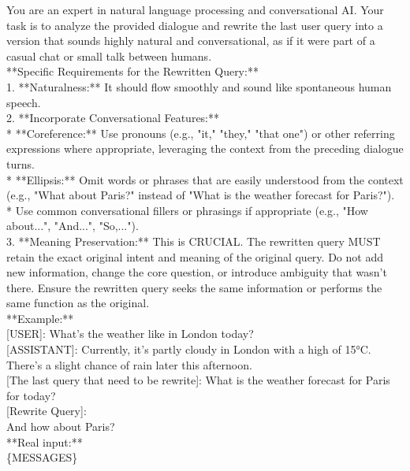 
\begin{tcolorbox}[
    enhanced,
    colback=white, %
    colframe=black, %
    arc=5mm, %
    boxrule=1pt,
    left=2mm, %
    right=2mm, %
    top=1mm, %
    bottom=1mm %
]

You are an expert in natural language processing and conversational AI. Your task is to analyze the provided dialogue and rewrite the last user query into a version that sounds highly natural and conversational, as if it were part of a casual chat or small talk between humans.\\
 
**Specific Requirements for the Rewritten Query:**\\
 
1.  **Naturalness:** It should flow smoothly and sound like spontaneous human speech.\\
2.  **Incorporate Conversational Features:**\\
    *   **Coreference:** Use pronouns (e.g., "it," "they," "that one") or other referring expressions where appropriate, leveraging the context from the preceding dialogue turns.\\
    *   **Ellipsis:** Omit words or phrases that are easily understood from the context (e.g., "What about Paris?" instead of "What is the weather forecast for Paris?").\\
    *   Use common conversational fillers or phrasings if appropriate (e.g., "How about...", "And...", "So,...").\\
3.  **Meaning Preservation:** This is CRUCIAL. The rewritten query MUST retain the exact original intent and meaning of the original query. Do not add new information, change the core question, or introduce ambiguity that wasn't there. Ensure the rewritten query seeks the same information or performs the same function as the original.\\
 
 
**Example:**\\
{[USER]}: What's the weather like in London today?\\
{[ASSISTANT]}: Currently, it's partly cloudy in London with a high of 15°C. There's a slight chance of rain later this afternoon.\\
{[The last query that need to be rewrite]}: What is the weather forecast for Paris for today?\\
 
[Rewrite Query]:\\
And how about Paris?\\
 
**Real input:**\\
\{MESSAGES\}\\

\end{tcolorbox}